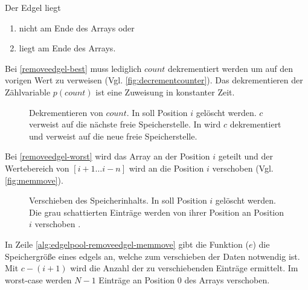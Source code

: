 

Der Edgel liegt
\begin{enumerate}
	\item nicht am Ende des Arrays oder \label{removeedgel-worst}
	\item liegt am Ende des Arrays. \label{removeedgel-best}
\end{enumerate}

Bei \autoref{removeedgel-best} muss lediglich $\mathit{count}$ dekrementiert werden um auf den vorigen Wert zu verweisen
 (Vgl. \autoref{fig:decrementcounter}). Das dekrementieren der Zählvariable $p(\mathit{count})$ ist eine Zuweisung in
 konstanter Zeit.

\begin{figure}[!ht]
	\centering
	\subfigure[]{
		
		\label{fig:decrementcounter-before}
	}
	\subfigure[]{
		
		\label{fig:decrementcounter-after}
	}
	\caption{Dekrementieren von $\mathit{count}$. In  soll Position $i$ gelöscht
	 werden. $c$ verweist auf die nächste freie Speicherstelle. In  wird $c$
	 dekrementiert und verweist auf die neue freie Speicherstelle.}
	\label{fig:decrementcounter}
\end{figure}

Bei \autoref{removeedgel-worst} wird das Array an der Position $i$ geteilt und der Wertebereich von $[i+1 \dotsc i-n]$
 wird an die Position $i$ verschoben (Vgl. \autoref{fig:memmove}).

\begin{figure}[!ht]
	\centering
	\subfigure[]{
		
		\label{fig:memmove-before}
	}
	\subfigure[]{
		
		\label{fig:memmove-after}
	}
	\caption{Verschieben des Speicherinhalts. In  soll Position $i$ gelöscht werden. Die
	 grau schattierten Einträge werden von ihrer Position an Position $i$ verschoben .}
	\label{fig:memmove}
\end{figure}

In Zeile \ref{alg:edgelpool-removeedgel-memmove} gibt die Funktion ($e$) die Speichergröße eines
 \glspl{edgel} an, welche zum verschieben der Daten notwendig ist. Mit $c - (i + 1)$ wird die Anzahl der zu
 verschiebenden Einträge ermittelt. Im worst-case werden $N-1$ Einträge an Position $0$ des Arrays verschoben.

